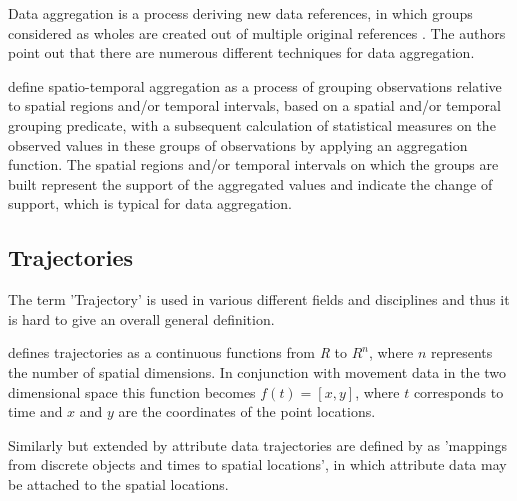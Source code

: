 \documentclass[12pt, oneside, a4paper]{scrbook}
\begin{document}
Data aggregation is a process deriving new data references, in which groups considered as wholes are created out of multiple original references \citep{andrienko2006exploratory}. The authors point out that there are numerous different techniques for data aggregation.
\par\medskip
\citet{stasch_meaningful_2014} define spatio-temporal aggregation as a process of grouping observations relative to spatial regions and/or temporal intervals, based on a spatial and/or temporal grouping predicate, with a subsequent calculation of statistical measures on the observed values in these groups of observations by applying an aggregation function.
The spatial regions and/or temporal intervals on which the groups are built represent the support of the aggregated values and indicate the change of support, which is typical for data aggregation.
\par\medskip

\subsection*{Trajectories}
The term 'Trajectory' is used in various different fields and disciplines and thus it is hard to give an overall general definition.
\par\medskip

\citet{roduit2009trajectory} defines trajectories as a continuous functions from \textit{R} to $R^n$, where $n$ represents the number of spatial dimensions.
In conjunction with movement data in the two dimensional space this function becomes $f(t) = [x, y]$, where $t$ corresponds to time and $x$ and $y$ are the coordinates of the point locations.
\par\medskip

Similarly but extended by attribute data trajectories are defined by \citet{stasch_meaningful_2014} as 'mappings from discrete objects and times to spatial locations', in which attribute data may be attached to the spatial locations.
\par\medskip



\end{document}
